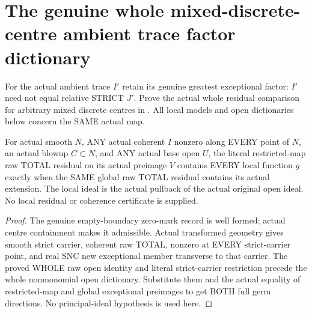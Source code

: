 \section{The genuine whole mixed-discrete-centre ambient trace factor dictionary}

For the actual ambient trace $I'$ retain its genuine greatest exceptional
factor: $I'$ need not equal relative STRICT $J'$. Prove the actual whole
residual comparison for arbitrary mixed discrete centres in
\cite[Remark~12.6, pp.~293--295]{bierstone-milman97-invent-math}.
All local models and open dictionaries below concern the SAME actual map.

\begin{lemma}
\label{hir:sharp-actual-raw-total-full-open-residual-germs}
\leanok
For actual smooth $N$, ANY actual coherent $I$ nonzero along EVERY point
of $N$, an actual blowup $C\subset N$, and ANY actual base open $U$,
the literal restricted-map raw TOTAL residual on its actual preimage $V$
contains EVERY local function $g$ exactly when the SAME global raw TOTAL
residual contains its actual extension. The local ideal is the actual
pullback of the actual original open ideal. No local residual or coherence
certificate is supplied.
\end{lemma}
\begin{proof}
The genuine empty-boundary zero-mark record is well formed; actual centre
containment makes it admissible. Actual transformed geometry gives smooth
strict carrier, coherent raw TOTAL, nonzero at EVERY strict-carrier point,
and real SNC new exceptional member transverse to that carrier. The proved
WHOLE raw open identity and literal strict-carrier restriction precede the
whole nonmonomial open dictionary. Substitute them and the actual equality
of restricted-map and global exceptional preimages to get BOTH full germ
directions. No principal-ideal hypothesis is used here.
\end{proof}


